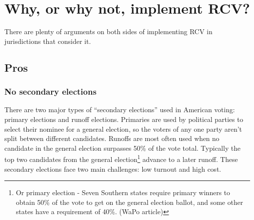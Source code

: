 \documentclass[12pt,twoside]{reedthesis}
\theoremstyle{definition}
\theoremstyle{definition}
\theoremstyle{definition}
\theoremstyle{remark}
\begin{document}
\hypertarget{why-or-why-not-implement-rcv}{%
\section{Why, or why not, implement
RCV?}\label{why-or-why-not-implement-rcv}}

There are plenty of arguments on both sides of implementing RCV in
jurisdictions that consider it.

\hypertarget{pros}{%
\subsection{Pros}\label{pros}}

\hypertarget{no-secondary-elections}{%
\subsubsection{No secondary elections}\label{no-secondary-elections}}

There are two major types of ``secondary elections'' used in American
voting: primary elections and runoff elections. Primaries are used by
political parties to select their nominee for a general election, so the
voters of any one party aren't split between different candidates.
Runoffs are most often used when no candidate in the general election
surpasses 50\% of the vote total. Typically the top two candidates from
the general election\footnote{Or primary election - Seven Southern
  states require primary winners to obtain 50\% of the vote to get on
  the general election ballot, and some other states have a requirement
  of 40\%. (WaPo article)} advance to a later runoff. These secondary
elections face two main challenges: low turnout and high cost.
\end{document}
